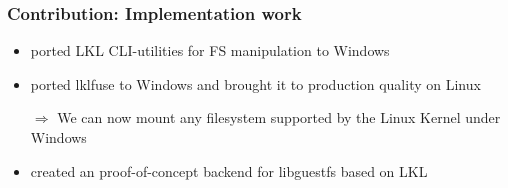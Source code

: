 

\begin{frame}

\frametitle{Contribution: Implementation work}
\begin{itemize}
    \item ported LKL CLI-utilities for FS manipulation to Windows
    \item ported lklfuse to Windows and brought it to production quality on Linux
    \item[$\Rightarrow$] We can now mount any filesystem supported by the Linux Kernel under Windows
    \item created an proof-of-concept backend for libguestfs based on LKL
\end{itemize}



\end{frame}
